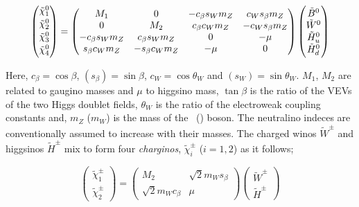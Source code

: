 				\begin{equation}
				\label{eq:neutralino_mixing}
					\begin{pmatrix}  \ninoone \\ \ninotwo \\ \ninothree \\ \ninofour \end{pmatrix}	
					= 
					\begin{pmatrix}
						M_1 & 0 & - c_\beta s_W m_Z &  c_W s_\beta m_Z  \\
						0 & M_2 & c_\beta c_W m_Z  &  - c_W s_\beta m_Z \\
						- c_\beta s_W m_Z  & c_\beta s_W m_Z  & 0 & - \mu \\ 
						s_\beta c_W m_Z  & - s_\beta c_W m_Z & - \mu & 0  
					\end{pmatrix}
					\begin{pmatrix}
						\tilde{B}^{0} \\
						\tilde{W}^{0} \\
						\tilde{H}^{0}_u \\
						\tilde{H}^{0}_d
					\end{pmatrix}
				\end{equation}

				\noindent Here, $c_{\beta} = \cos \beta$,  $(s_{\beta}) = \sin \beta$, $c_W = \cos \theta_W$ and $(s_W) = \sin \theta_W$. $M_1$, $M_2$ are related to gaugino masses and $\mu$ to higgsino mass, $\tan \beta$ is the ratio of the \ac{VEV}s of the two Higgs doublet fields, $\theta_W$ is the ratio of the electroweak coupling constants and, $m_Z$ ($m_W$) is the mass of the \Zboson\ (\Wboson) boson. The neutralino indeces are conventionally assumed to increase with their masses. The charged winos $\tilde{W}^{\pm}$ and higgsinos $\tilde{H}^{\pm}$ mix to form four \textit{charginos}, $\tilde{\chi}^{\pm}_i$ ($i=1,2$) as it follows;

				\begin{equation}
				\label{eq:chargino_mixing}
						\begin{pmatrix}  \tilde{\chi}^{\pm}_1 \\ \tilde{\chi}^{\pm}_2 \end{pmatrix}	
						= 
						\begin{pmatrix}
							M_2 & \sqrt{2} m_W s_\beta \\
							\sqrt{2} m_W c_\beta & \mu  
						\end{pmatrix}
						\begin{pmatrix}
							\tilde{W}^{\pm} \\
							\tilde{H}^{\pm}
						\end{pmatrix}
				\end{equation}

